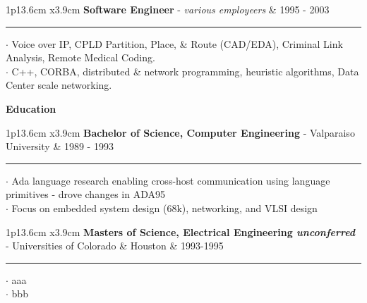 \documentclass[10pt]{article}
\newcommand{\cvsection}[1]
{
	\begin{center}
		\large\textcolor{sectcol}{\textbf{#1}}
	\end{center}
}
\newcommand{\cveventone}[4]
{

\begin{tabular*}{1\textwidth}{p{13.6cm}  x{3.9cm}}
	\textbf{#2} - \textcolor{bgcol}{#3} &   \vspace{2.5pt}\textcolor{sectcol}{#1}
\end{tabular*}

\vspace{-8pt}
\textcolor{softcol}{\hrule}
\vspace{6pt}

  $\cdot$ #4\\[3pt]

}
\newcommand{\cveventtwo}[5]
{

\begin{tabular*}{1\textwidth}{p{13.6cm}  x{3.9cm}}
	\textbf{#2} - \textcolor{bgcol}{#3} &   \vspace{2.5pt}\textcolor{sectcol}{#1}
\end{tabular*}

\vspace{-8pt}
\textcolor{softcol}{\hrule}
\vspace{6pt}

  $\cdot$ #4\\[3pt]
  $\cdot$ #5\\[6pt]

}
\newcommand{\mystrut}{\rule[-.3\baselineskip]{0pt}{\baselineskip}}
\begin{document}
\cveventtwo{1995 - 2003}{Software Engineer}{\it various employeers}
           {Voice over IP, CPLD Partition, Place, \& Route (CAD/EDA),
             Criminal Link Analysis, Remote Medical Coding.}
           {C++, CORBA, distributed \& network programming, heuristic
             algorithms, Data Center scale networking.}

%
%
%
%
\cvsection{Education}

%
\cveventtwo{1989 - 1993}
           {Bachelor of Science, Computer Engineering}
           {Valparaiso University}
           {Ada language research enabling cross-host communication
             using language primitives - drove changes in ADA95}
           {Focus on embedded system design (68k), networking, and
             VLSI design}

\cveventtwo{1993-1995}
           {Masters of Science, Electrical Engineering {\it
               unconferred} }
           {Universities of Colorado \& Houston}
           {aaa}
           {bbb}


\null
\vspace*{\fill}
\hspace{-0.25\linewidth}\colorbox{bgcol}{\makebox[1.5\linewidth][c]{\mystrut \small \textcolor{white}{www.elfwerks.org/ericg} $\cdot$ \textcolor{white}{github.com/egustafson}}}




%
%
%
%
%
%
\end{document}
